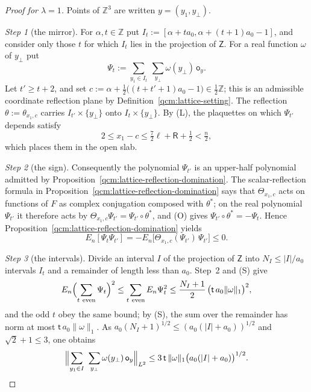\documentclass[11pt,letterpaper,reqno]{amsart}
\theoremstyle{definition}
\begin{document}
\begin{proof}[Proof for $\lambda=1$]
Points of $\mathbb Z^3$ are written $y=(y_1,y_\perp)$.

\emph{Step 1} (the mirror).
For $\alpha,t\in\mathbb Z$ put $I_t:=[\alpha+ta_0,\alpha+(t+1)a_0-1]$, and consider only those $t$ for which $I_t$ lies in the projection of $\mathsf Z$.
For a real function $\omega$ of $y_\perp$ put
\begin{equation*}
\Psi_t:=\sum_{y_1\in I_t}\ \sum_{y_\perp}\omega(y_\perp)\,\mathsf o_y.
\end{equation*}
Let $t'\ge t+2$, and set $c:=\alpha+\frac12\bigl((t+t'+1)a_0-1\bigr)\in\frac12\mathbb Z$; this is an admissible coordinate reflection plane by Definition~\ref{qcm:lattice-setting}.
The reflection $\theta:=\theta_{x_1,c}$ carries $I_{t'}\times\{y_\perp\}$ onto $I_t\times\{y_\perp\}$.
By (L), the plaquettes on which $\Psi_{t'}$ depends satisfy
\begin{equation*}
2\le x_1-c\le\tfrac72\ell+\mathsf R+\tfrac12<\tfrac n2,
\end{equation*}
which places them in the open slab.

\emph{Step 2} (the sign).
Consequently the polynomial $\Psi_{t'}$ is an upper-half polynomial admitted by Proposition~\ref{qcm:lattice-reflection-domination}.
The scalar-reflection formula in Proposition~\ref{qcm:lattice-reflection-domination} says that $\Theta_{x_1,c}$ acts on functions of $F$ as complex conjugation composed with $\theta^*$;
on the real polynomial $\Psi_{t'}$ it therefore acts by $\Theta_{x_1,c}\Psi_{t'}=\Psi_{t'}\circ\theta^*$, and (O) gives $\Psi_{t'}\circ\theta^*=-\Psi_t$.
Hence Proposition~\ref{qcm:lattice-reflection-domination} yields
\begin{equation*}
E_n[\Psi_t\Psi_{t'}]=-E_n\bigl[\Theta_{x_1,c}(\Psi_{t'})\,\Psi_{t'}\bigr]\le0.
\end{equation*}

\emph{Step 3} (the intervals).
Divide an interval $I$ of the projection of $\mathsf Z$ into $N_I\le|I|/a_0$ intervals $I_t$ and a remainder of length less than $a_0$.
Step~2 and (S) give
\begin{equation*}
E_n\Bigl(\sum_{t\ \mathrm{even}}\Psi_t\Bigr)^2\le\sum_{t\ \mathrm{even}}E_n\Psi_t^2\le\frac{N_I+1}{2}\,\bigl(\mathsf t\,a_0\|\omega\|_1\bigr)^2,
\end{equation*}
and the odd $t$ obey the same bound;
by (S), the sum over the remainder has norm at most $\mathsf t\,a_0\|\omega\|_1$.
As $a_0(N_I+1)^{1/2}\le(a_0(|I|+a_0))^{1/2}$ and $\sqrt2+1\le3$, one obtains
\begin{equation*}
\Bigl\|\sum_{y_1\in I}\ \sum_{y_\perp}\omega(y_\perp)\,\mathsf o_y\Bigr\|_{L^2}\le3\,\mathsf t\,\|\omega\|_1\bigl(a_0(|I|+a_0)\bigr)^{1/2}.
\end{equation*}


\end{proof}
\end{document}
